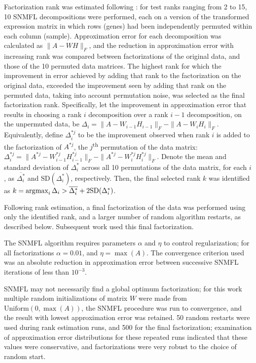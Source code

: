 \documentclass[thesis.tex]{subfiles}
\begin{document}
Factorization rank was estimated following \cite{Frigyesi2008}: for test ranks ranging from 2 to 15, 10 \gls{SNMFL} decompositions were performed, each on a version of the transformed expression matrix in which rows (genes) had been independently permuted within each column (sample).  Approximation error for each decomposition was calculated as $\|A - W H\|_F$, and the reduction in approximation error with increasing rank was compared between factorizations of the original data, and those of the 10 permuted data matrices.  The highest rank for which the improvement in error achieved by adding that rank to the factorization on the original data, exceeded the improvement seen by adding that rank on the permuted data, taking into account permutation noise, was selected as the final factorization rank.  Specifically, let the improvement in approximation error that results in choosing a rank $i$ decomposition over a rank $i-1$ decomposition, on the unpermuted data, be $\Delta_i = \|A - W_{i-1} H_{i-1}\|_F - \|A - W_{i} H_{i}\|_F$.  Equivalently, define $\Delta^{*j}_i$ to be the improvement observed when rank $i$ is added to the factorization of $A^{*j}$, the $j$\textsuperscript{th} permutation of the data matrix: $\Delta^{*j}_i = \|A^{*j} - W^{*j}_{i-1} H^{*j}_{i-1}\|_F - \|A^{*j} - W^{*j}_{i} H^{*j}_{i}\|_F$.  Denote the mean and standard deviation of $\Delta^{*}_i$ across all 10 permutations of the data matrix, for each $i$, as $\overline{\Delta^{*}_i}$ and $\text{SD}(\Delta^{*}_i)$, respectively.  Then, the final selected rank $k$ was identified as $k = \operatorname*{\arg\!\max}_i \Delta_i > \overline{\Delta^{*}_i} + 2 \text{SD}(\Delta^{*}_i)$.

Following rank estimation, a final factorization of the data was performed using only the identified rank, and a larger number of random algorithm restarts, as described below.  Subsequent work used this final factorization.

The \gls{SNMFL} algorithm requires parameters $\alpha$ and $\eta$ to control regularization; for all factorizations $\alpha = 0.01$, and $\eta = \max(A)$.  The convergence criterion used was an absolute reduction in approximation error between successive \gls{SNMFL} iterations of less than $10^{-3}$.

\gls{SNMFL} may not necessarily find a global optimum factorization; for this work multiple random initializations of matrix $W$ were made from $\text{Uniform}(0, \max(A))$, the \gls{SNMFL} procedure was run to convergence, and the result with lowest approximation error was retained.  50 random restarts were used during rank estimation runs, and 500 for the final factorization; examination of approximation error distributions for these repeated runs indicated that these values were conservative, and factorizations were very robust to the choice of random start.
\end{document}
